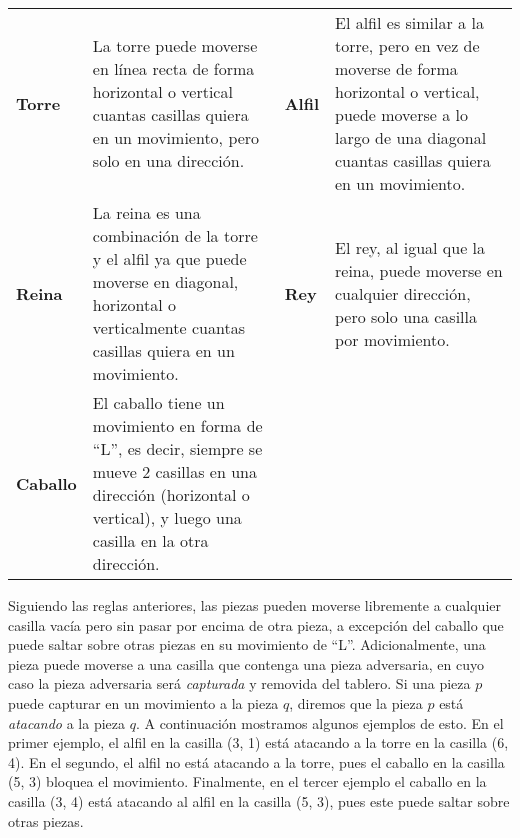 \documentclass{oci}
\begin{document}
\begin{problemDescription}
\newcommand{\boardsmall}[1][]{\scalebox{0.75}{\chessboard[#1]}}
\newcommand{\vadj}{\vspace{0em}}
\def\arraystretch{1.5}
\setlength{\tabcolsep}{0em}
\begin{tabularx}{\textwidth}[t]{AB@{\hspace{.03\textwidth}}AB}
  \textbf{Torre}
  \boardsmall[setpieces={rc3}, markfields={c1,c2,c4,c5,a3,b3,d3,e3}]
  &
  \vadj
  La torre puede moverse en línea recta de forma horizontal o vertical cuantas casillas quiera en
  un movimiento, pero solo en una dirección.

  &
  \textbf{Alfil}

  \boardsmall[setpieces={bc3}, markfields={a1,b2,d4,e5,a5,b4,d2,e1}]
  &
  \vadj
  El alfil es similar a la torre, pero en vez de moverse de forma horizontal o vertical,
  puede moverse a lo largo de una diagonal cuantas casillas quiera en un movimiento.
  \\

  \textbf{Reina}
  \boardsmall[setpieces={qc3}, markfields={a1,b2,d4,e5,a5,b4,d2,e1,c1,c2,c4,c5,a3,b3,d3,e3}]
  &
  \vspace{0.1em}
  La reina es una combinación de la torre y el alfil ya que puede moverse en diagonal,
  horizontal o verticalmente cuantas casillas quiera en un movimiento.

  &
  \textbf{Rey}
  \boardsmall[setpieces={kc3}, markfields={b2,d4,b4,d2,c2,c4,b3,d3}]
  &
  \vspace{0.2em}
  El rey, al igual que la reina, puede moverse en cualquier dirección, pero solo una casilla por
  movimiento.
  \\

  \textbf{Caballo}
  \boardsmall[setpieces={nc3}, markfields={a4,a2,b5,b1,d5,d1,e4,e2}]
  &
  \vspace{0.1em}
  El caballo tiene un movimiento en forma de ``L'', es decir, siempre se mueve
  2 casillas en una dirección (horizontal o vertical), y luego una casilla en la otra dirección.
\end{tabularx}

Siguiendo las reglas anteriores, las piezas pueden moverse libremente a cualquier casilla vacía
pero sin pasar por encima de otra pieza, a excepción del caballo que puede saltar sobre otras
piezas en su movimiento de ``L''.
Adicionalmente, una pieza puede moverse a una casilla que contenga una pieza adversaria, en cuyo
caso la pieza adversaria será \emph{capturada} y removida del tablero.
Si una pieza $p$ puede capturar en un movimiento a la pieza $q$,
diremos que la pieza $p$ está \emph{atacando} a la pieza $q$.
A continuación mostramos algunos ejemplos de esto.
En el primer ejemplo, el alfil en la casilla (3, 1) está atacando a la torre en la casilla (6, 4).
En el segundo, el alfil no está atacando a la torre, pues el caballo en la casilla (5, 3)
bloquea el movimiento.
Finalmente, en el tercer ejemplo el caballo en la casilla (3, 4) está atacando al alfil
en la casilla (5, 3), pues este puede saltar sobre otras piezas.


\end{problemDescription}
\end{document}
